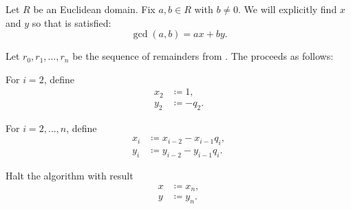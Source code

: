 \begin{algorithm}\label{alg:extended_euclidean_algorithm}
  Let \( R \) be an Euclidean domain. Fix \( a, b \in R \) with \( b \neq 0 \). We will explicitly find \( x \) and \( y \) so that  is satisfied:
  \begin{equation*}
    \gcd(a, b) = ax + by.
  \end{equation*}

  Let \( r_0, r_1, \ldots, r_n \) be the sequence of remainders from . The  proceeds as follows:

  \begin{algenum}
     For \( i = 2 \), define
    \begin{align*}
      x_2 &\coloneqq 1, \\
      y_2 &\coloneqq -q_2.
    \end{align*}

     For \( i = 2, \ldots, n \), define
    \begin{align*}
      x_i &\coloneqq x_{i-2} - x_{i-1} q_i, \\
      y_i &\coloneqq y_{i-2} - y_{i-1} q_i.
    \end{align*}

     Halt the algorithm with result
    \begin{align*}
      x &\coloneqq x_n, \\
      y &\coloneqq y_n.
    \end{align*}
  \end{algenum}
\end{algorithm}
